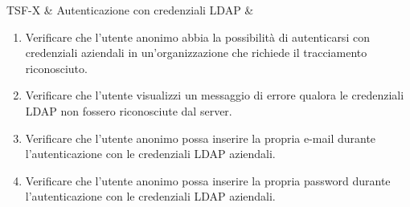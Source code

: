 TSF-X & Autenticazione con credenziali LDAP & \begin{enumerate}
\item Verificare che l'utente anonimo abbia la possibilità di autenticarsi con credenziali aziendali in un'organizzazione che richiede il tracciamento riconosciuto.
\item Verificare che l'utente visualizzi un messaggio di errore qualora le credenziali LDAP non fossero riconosciute dal server.
\item Verificare che l'utente anonimo possa inserire la propria e-mail durante l'autenticazione con le credenziali LDAP aziendali.
\item Verificare che l'utente anonimo possa inserire la propria password durante l'autenticazione con le credenziali LDAP aziendali.
\end{enumerate}
